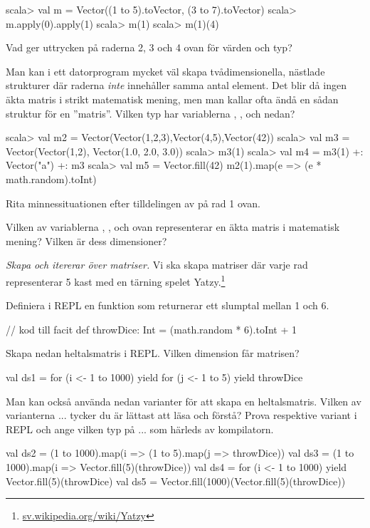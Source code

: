 \begin{REPL}
scala> val m = Vector((1 to 5).toVector, (3 to 7).toVector)
scala> m.apply(0).apply(1)
scala> m(1)
scala> m(1)(4)
\end{REPL}

\Subtask Vad ger uttrycken på raderna 2, 3 och 4 ovan för värden och typ? 

\Subtask Man kan i ett datorprogram mycket väl skapa tvådimensionella, nästlade strukturer där raderna \emph{inte} innehåller samma antal element. Det blir då ingen äkta matris i strikt matematisk mening, men man kallar ofta ändå en sådan struktur för en ''matris''. Vilken typ har variablerna , ,  och  nedan? 

\begin{REPL}
scala> val m2 = Vector(Vector(1,2,3),Vector(4,5),Vector(42))
scala> val m3 = Vector(Vector(1,2), Vector(1.0, 2.0, 3.0))
scala> m3(1)
scala> val m4 = m3(1) +: Vector("a") +: m3
scala> val m5 = Vector.fill(42){ m2(1).map(e => (e * math.random).toInt) }
\end{REPL}

\Subtask\Pen Rita minnessituationen efter tilldelingen av  på rad 1 ovan.

\Subtask\Pen Vilken av variablerna , ,  och  ovan representerar en äkta matris i matematisk mening? Vilken är dess dimensioner?



\Task \emph{Skapa och itererar över matriser.} Vi ska skapa matriser där varje rad representerar 5 kast med en tärning spelet Yatzy.\footnote{\href{https://sv.wikipedia.org/wiki/Yatzy}{sv.wikipedia.org/wiki/Yatzy}}


\Subtask Definiera i REPL en funktion  som returnerar ett slumptal mellan 1 och 6.
\begin{Code}
// kod till facit
def throwDice: Int = (math.random * 6).toInt + 1
\end{Code}


\Subtask Skapa nedan heltalsmatris i REPL. Vilken dimension får matrisen?
\begin{REPL}
val ds1 = for (i <- 1 to 1000) yield { 
            for (j <- 1 to 5) yield throwDice 
          }
\end{REPL}

\Subtask\Pen Man kan också använda nedan varianter för att skapa en heltalsmatris. Vilken av varianterna  ...  tycker du är lättast att läsa och förstå? Prova respektive variant i REPL och ange vilken typ på  ...  som härleds av kompilatorn.
\begin{REPL}
val ds2 = (1 to 1000).map(i => (1 to 5).map(j => throwDice))  
val ds3 = (1 to 1000).map(i => Vector.fill(5)(throwDice)) 
val ds4 = for (i <- 1 to 1000) yield Vector.fill(5)(throwDice) 
val ds5 = Vector.fill(1000)(Vector.fill(5)(throwDice))
\end{REPL}


